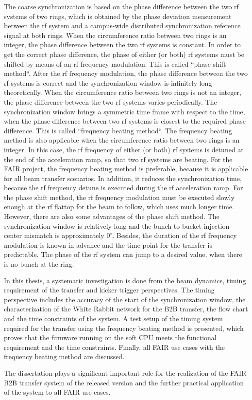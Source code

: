 The coarse synchronization is based on the phase difference between the two rf systems of two rings, which is obtained by the phase deviation measurement between the rf system and a campus-wide distributed synchronization reference signal at both rings. When the circumference ratio between two rings is an integer, the phase difference between the two rf systems is constant. In order to get the correct phase difference, the phase of either (or both) rf systems must be shifted by means of an rf frequency modulation. This is called ``phase shift method``. After the rf frequency modulation, the phase difference between the two rf systems is correct and the synchronization window is infinitely long theoretically. When the circumference ratio between two rings is not an integer, the phase difference between the two rf systems varies periodically. The synchronization window brings a symmetric time frame with respect to the time, when the phase difference between two rf systems is closest to the required phase difference. This is called ``frequency beating method``. The frequency beating method is also applicable when the circumference ratio between two rings is an integer. In this case, the rf frequency of either (or both) rf systems is detuned at the end of the acceleration ramp, so that two rf systems are beating. For the FAIR project, the frequency beating method is preferable, because it is applicable for all beam transfer scenarios. In addition, it reduces the synchronization time, because the rf frequency detune is executed during the rf acceleration ramp. For the phase shift method, the rf frequency modulation must be executed slowly enough at the rf flattop for the beam to follow, which uses much longer time. However, there are also some advantages of the phase shift method. The synchronization window is relatively long and the bunch-to-bucket injection center mismatch is approximately $0^\circ$. Besides, the duration of the rf frequency modulation is known in advance and the time point for the transfer is predictable. The phase of the rf system can jump to a desired value, when there is no bunch at the ring.  


 
In this thesis, a systematic investigation is done from the beam dynamics, timing requirement of the transfer and kicker trigger perspectives. The timing perspective includes the accuracy of the start of the synchronization window, the characterization of the White Rabbit network for the B2B transfer, the flow chart and the time constraints of the system. A test setup of the timing system required for the transfer using the frequency beating method is presented, which proves that the firmware running on the soft CPU meets the functional requirement and the time constraints. Finally, all FAIR use cases with the frequency beating method are discussed.

The dissertation plays a significant important role for the realization of the FAIR B2B transfer system of the released version and the further practical application of the system to all FAIR use cases.  



